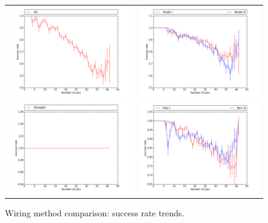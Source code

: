 \begin{figure}[H]
\begin{center}
\begin{tabular}{cc}
\includegraphics[width=7cm]{Images/wiring_all_success_trend.png} &
\includegraphics[width=7cm]{Images/wiring_node_success_trend.png} \\
\includegraphics[width=7cm]{Images/wiring_straight_success_trend.png} &
\includegraphics[width=7cm]{Images/wiring_pair_success_trend.png}
\end{tabular}
\end{center}
\label{fig:wiring_success_trend}
\caption{Wiring method comparison: success rate trends.}
\end{figure}

